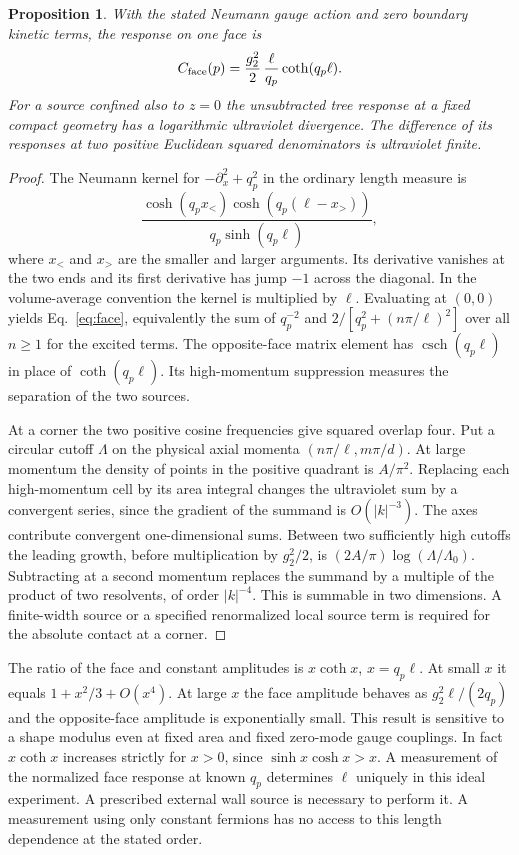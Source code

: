 \documentclass[aps,prd,reprint,onecolumn,nofootinbib,amsmath,amssymb]{revtex4-2}
\newtheorem{proposition}{Proposition}
\begin{document}
\begin{proposition}
With the stated Neumann gauge action and zero boundary kinetic terms, the response on one face is
\begin{equation}
 C_{\rm face}(p)=\frac{g_2^2}{2}\,
             \frac{\ell}{q_p}\coth(q_p\ell).
 \label{eq:face}
\end{equation}
For a source confined also to $z=0$ the unsubtracted tree response at a fixed compact geometry has a logarithmic ultraviolet divergence. The difference of its responses at two positive Euclidean squared denominators is ultraviolet finite.
\end{proposition}

\begin{proof}
The Neumann kernel for $-\partial_x^2+q_p^2$ in the ordinary length measure is
\begin{equation}
 \frac{\cosh(q_p x_<)\cosh(q_p(\ell-x_>))}
      {q_p\sinh(q_p\ell)} ,
\end{equation}
where $x_<$ and $x_>$ are the smaller and larger arguments. Its derivative vanishes at the two ends and its first derivative has jump $-1$ across the diagonal. In the volume-average convention the kernel is multiplied by $\ell$. Evaluating at $(0,0)$ yields Eq.~\eqref{eq:face}, equivalently the sum of $q_p^{-2}$ and $2/[q_p^2+(n\pi/\ell)^2]$ over all $n\ge1$ for the excited terms. The opposite-face matrix element has $\operatorname{csch}(q_p\ell)$ in place of $\coth(q_p\ell)$. Its high-momentum suppression measures the separation of the two sources.

At a corner the two positive cosine frequencies give squared overlap four. Put a circular cutoff $\Lambda$ on the physical axial momenta $(n\pi/\ell,m\pi/d)$. At large momentum the density of points in the positive quadrant is $A/\pi^2$. Replacing each high-momentum cell by its area integral changes the ultraviolet sum by a convergent series, since the gradient of the summand is $O(|k|^{-3})$. The axes contribute convergent one-dimensional sums. Between two sufficiently high cutoffs the leading growth, before multiplication by $g_2^2/2$, is $(2A/\pi)\log(\Lambda/\Lambda_0)$. Subtracting at a second momentum replaces the summand by a multiple of the product of two resolvents, of order $|k|^{-4}$. This is summable in two dimensions. A finite-width source or a specified renormalized local source term is required for the absolute contact at a corner.
\end{proof}

The ratio of the face and constant amplitudes is $x\coth x$, $x=q_p\ell$. At small $x$ it equals $1+x^2/3+O(x^4)$. At large $x$ the face amplitude behaves as $g_2^2\ell/(2q_p)$ and the opposite-face amplitude is exponentially small. This result is sensitive to a shape modulus even at fixed area and fixed zero-mode gauge couplings. In fact $x\coth x$ increases strictly for $x>0$, since $\sinh x\cosh x>x$. A measurement of the normalized face response at known $q_p$ determines $\ell$ uniquely in this ideal experiment. A prescribed external wall source is necessary to perform it. A measurement using only constant fermions has no access to this length dependence at the stated order.
\end{document}
